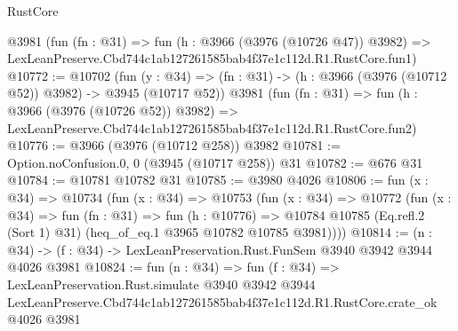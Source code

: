 \begin{lexlean}{RustCore}
\begin{coremodule}
    @3981
    (fun (fn : @31) =>
    fun (h : @3966 (@3976 (@10726 @47)) @3982) =>
    LexLeanPreserve.Cbd744c1ab127261585bab4f37e1c112d.R1.RustCore.fun1)
@10772 := @10702
    (fun (y : @34) => (fn : @31) -> (h : @3966 (@3976 (@10712 @52)) @3982) -> @3945 (@10717 @52))
    @3981
    (fun (fn : @31) =>
    fun (h : @3966 (@3976 (@10726 @52)) @3982) =>
    LexLeanPreserve.Cbd744c1ab127261585bab4f37e1c112d.R1.RustCore.fun2)
@10776 := @3966 (@3976 (@10712 @258)) @3982
@10781 := Option.noConfusion.{0, 0} (@3945 (@10717 @258)) @31
@10782 := @676 @31
@10784 := @10781 @10782 @31
@10785 := @3980 @4026
@10806 := fun (x : @34) =>
  @10734
    (fun (x : @34) =>
    @10753
      (fun (x : @34) =>
      @10772
        (fun (x : @34) =>
        fun (fn : @31) =>
        fun (h : @10776) =>
        @10784 @10785 (Eq.refl.{2} (Sort 1) @31) (heq_of_eq.{1} @3965 @10782 @10785 @3981))))
@10814 := (n : @34) -> (f : @34) -> LexLeanPreservation.Rust.FunSem @3940 @3942 @3944 @4026 @3981
@10824 := fun (n : @34) =>
  fun (f : @34) =>
  LexLeanPreservation.Rust.simulate
    @3940
    @3942
    @3944
    LexLeanPreserve.Cbd744c1ab127261585bab4f37e1c112d.R1.RustCore.crate_ok
    @4026
    @3981
\end{coremodule}
\end{lexlean}
